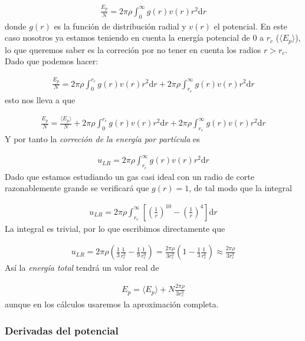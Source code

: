 \documentclass[11pt]{article}
\newcommand{\parentesis}[1]{\left( #1  \right)}
\newcommand{\ccorchetes}[1]{\left[ #1  \right]}
\newcommand{\D}{\mathrm{d}}
\begin{document}
\begin{eqnarray}
	\frac{E_p}{N} =  2\pi \rho \int_0^\infty g(r) v(r) r^2 \D r 
\end{eqnarray}
donde $g(r)$ es la función de distribución radial y $v(r)$ el potencial. En este caso nosotros ya estamos teniendo en cuenta la energía potencial de $0$ a $r_c$ ($\langle E_p \rangle$), lo que queremos saber es la correción por no tener en cuenta los radios $r>r_c$. Dado que podemos hacer:

\begin{eqnarray*}
	\frac{E_p}{N} =  2\pi \rho \int_0^{r_c} g(r) v(r) r^2 \D r + 2\pi \rho \int_{r_c}^\infty g(r) v(r) r^2 \D r  
\end{eqnarray*}
esto nos lleva a que

\begin{eqnarray}
	\frac{E_p}{N} =  \frac{\langle E_p \rangle}{N} + 2\pi \rho \int_0^{r_c} g(r) v(r) r^2 \D r + 2\pi \rho \int_{r_c}^\infty g(r) v(r) r^2 \D r  
\end{eqnarray}
Y por tanto la \textit{correción de la energía por partícula} es

\begin{eqnarray}
	u_{LR} = 2\pi \rho  \int_{r_c}^\infty  g(r) v(r) r^2 \D r  
\end{eqnarray}
Dado que estamos estudiando un gas casi ideal con un radio de corte razonablemente grande se verificará que $g(r)=1$, de tal modo que la integral  

\begin{eqnarray}
	u_{LR} = 2\pi \rho  \int_{r_c}^\infty \ccorchetes{\parentesis{\frac{1}{r}}^{10}-\parentesis{\frac{1}{r}}^4}  \D r  
\end{eqnarray}
La integral es trivial, por lo que escribimos directamente que

\begin{eqnarray}
	u_{LR} = 2 \pi \rho \parentesis{\frac{1}{3} \frac{1}{r_c^3} - \frac{1}{9} \frac{1}{r_c^9}} = \frac{2\pi \rho}{3 r_c^3} \parentesis{1-\frac{1}{3} \frac{1}{r_c^6}} \approx \frac{2\pi \rho}{3 r_c^3}  
\end{eqnarray}
Así la \textit{energía total} tendrá un valor real de

\begin{eqnarray}
	E_p=  \langle E_p \rangle + N \frac{2\pi \rho}{3 r_c^3}  
\end{eqnarray}
aunque en los cálculos usaremos la aproximación completa.

\subsubsection{Derivadas del potencial}
\end{document}
